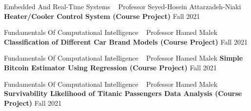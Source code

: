   \begin{cventries}
    
    
    \cventry
    {Embedded And Real-Time Systems ~ Professor Seyed-Hosein Attarzadeh-Niaki}
    {\textbf {Heater/Cooler Control System (Course Project)}}
    {}
    {Fall 2021}
    {}
    \vspace{0.0 cm}
  \end{cventries}
  \begin{cventries}
    
      \cventry
    {Fundamentals Of Computational Intelligence ~ Professor Hamed Malek}
    {\textbf {Classification of Different Car Brand Models (Course Project)}}
    {}
    {Fall 2021}
    {}
    \vspace{0.0 cm}
  \end{cventries}
  \begin{cventries}
	
	    \cventry
    {Fundamentals Of Computational Intelligence ~ Professor Hamed Malek}
    {\textbf {Simple Bitcoin Estimator Using Regression (Course Project)}}
    {}
    {Fall 2021}
    {}
    \vspace{0.0 cm}
  \end{cventries}
  \begin{cventries}

      \cventry
    {Fundamentals Of Computational Intelligence ~ Professor Hamed Malek}
    {\textbf {Survivability Likelihood of Titanic Passengers Data Analysis (Course Project)}}
    {}
    {Fall 2021}
    {}
    \vspace{0.0 cm}
  \end{cventries}

